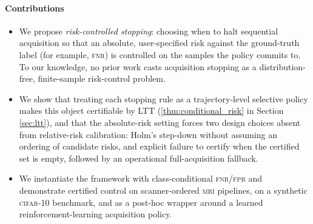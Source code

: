 \paragraph{Contributions}
\begin{itemize}[noitemsep]
    \item We propose \emph{risk-controlled stopping}: choosing when to halt sequential acquisition so that an absolute, user-specified risk against the ground-truth label (for example, \textsc{fnr}) is controlled on the samples the policy commits to. To our knowledge, no prior work casts acquisition stopping as a distribution-free, finite-sample risk-control problem.
    \item We show that treating each stopping rule as a trajectory-level selective policy makes this object certifiable by LTT (\cref{thm:conditional_risk} in Section \ref{sec:ltt}), and that the absolute-risk setting forces two design choices absent from relative-risk calibration: Holm's step-down without assuming an ordering of candidate risks, and explicit failure to certify when the certified set is empty, followed by an operational full-acquisition fallback.
    \item We instantiate the framework with class-conditional \textsc{fnr}/\textsc{fpr} and demonstrate certified control on scanner-ordered \textsc{mri} pipelines, on a synthetic \textsc{cifar}-10 benchmark, and as a post-hoc wrapper around a learned reinforcement-learning acquisition policy.
\end{itemize}
